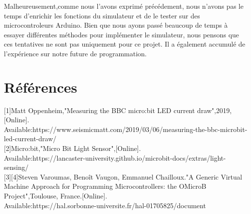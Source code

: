 \documentclass[14px]{article}
\begin{document}
Malheureusement,comme nous l'avons exprimé précédement, nous n'avons pas le temps d'enrichir les fonctions du simulateur et de le tester sur des microcontroleurs Arduino. Bien que nous ayons passé beaucoup de temps à essayer différentes méthodes pour implémenter le simulateur, nous pensons que ces tentatives ne sont pas uniquement pour ce projet. Il a également accumulé de l'expérience sur notre future de programmation.

\section{Références}
[1]Matt Oppenheim,"Measuring the BBC micro:bit LED current draw",2019,[Online].\\
Available:https://www.seismicmatt.com/2019/03/06/measuring-the-bbc-microbit-led-current-draw/\\

[2]Micro:bit,"Micro Bit Light Sensor",[Online].\\
Available:https://lancaster-university.github.io/microbit-docs/extras/light-sensing/\\

[3][4]Steven Varoumas, Benoît Vaugon, Emmanuel Chailloux."A Generic Virtual Machine Approach for Programming Microcontrollers: the OMicroB Project",Toulouse, France.[Online].\\
Available:https://hal.sorbonne-universite.fr/hal-01705825/document\\
\end{document}
